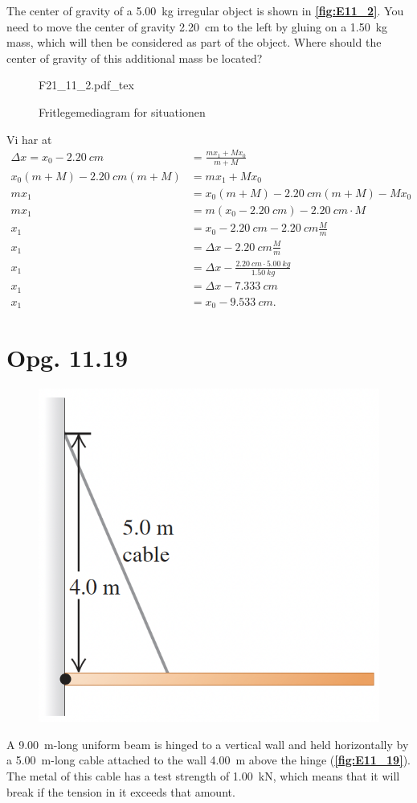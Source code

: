 \documentclass[12pt]{article}
\newcommand{\incfig}[2][1]{%
  \def\svgwidth{#1\columnwidth}
  {#2.pdf_tex}
}
\theoremstyle{definition}
\begin{document}
The center of gravity of a \qty{5,00}{kg} irregular object is shown in \textbf{\autoref{fig:E11_2}}. You need to move the center of gravity \qty{2,20}{cm}  to the left by gluing on a \qty{1,50}{kg}  mass, which will then be considered as part of the object. Where should the center of gravity of this additional mass be located?
\begin{figure}[ht]
  \centering
  \incfig[0.35]{F21_11_2}
  \caption{Fritlegemediagram for situationen}
  \label{fig:F21_11_2}
\end{figure}
\bigbreak
Vi har at
\begin{align*}
  \Delta x = x_0 - \qty{2,20}{cm} &= \frac{mx_1 + Mx_0}{m + M} \\
  x_0(m + M) - \qty{2,20}{cm} (m + M) &= mx_1 + Mx_0 \\
  mx_1 &= x_0(m + M) - \qty{2,20}{cm} (m + M) - Mx_0 \\
  mx_1 &= m(x_0 - \qty{2,20}{cm}) - \qty{2,20}{cm} \cdot M  \\
  x_1 &= x_0 - \qty{2,20}{cm} - \qty{2,20}{cm} \frac{M}{m} \\
  x_1 &= \Delta x - \qty{2,20}{cm} \frac{M}{m}  \\
  x_1 &= \Delta x - \frac{\qty{2,20}{cm} \cdot \qty{5,00}{kg}}{\qty{1,50}{kg}}  \\
  x_1 &= \Delta x - \qty{7,333}{cm}  \\
  x_1 &= x_0 - \qty{9,533}{cm}
.\end{align*}



\section*{Opg. 11.19}
\begin{figure} [ht]
  \centering
  \caption{}
  \includegraphics[width=0.3\linewidth]{../figures/E11_19.png}
  \label{fig:E11_19}
\end{figure}

A \qty{9,00}{m}-long uniform beam is hinged to a vertical wall and held horizontally by a \qty{5,00}{m}-long cable attached to the wall \qty{4,00}{m} above the hinge (\textbf{\autoref{fig:E11_19}}). The metal of this cable has a test strength of \qty{1,00}{kN}, which means that it will break if the tension in it exceeds that amount.
\end{document}
